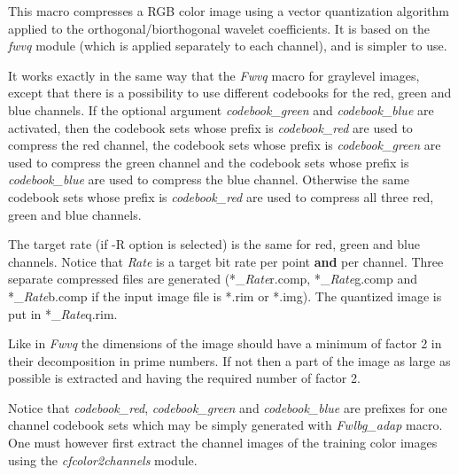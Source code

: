 This macro compresses a RGB color image using a vector quantization 
algorithm applied to the orthogonal/biorthogonal wavelet coefficients. 
It is based on the {\em fwvq} module (which is applied separately 
to each channel), and is simpler to use. 

It works exactly in the same way that the {\em Fwvq} macro for graylevel 
images, except that there is a possibility to use different codebooks 
for the red, green and blue channels. If the optional argument 
{\em codebook\_green} and {\em codebook\_blue} are activated, 
then the codebook sets whose prefix is {\em codebook\_red} are used 
to compress the red channel, the codebook sets whose prefix is 
{\em codebook\_green} are used to compress the green channel and 
the codebook sets whose prefix is {\em codebook\_blue} are used 
to compress the blue channel. Otherwise the same codebook sets whose prefix 
is {\em codebook\_red} are used to compress all three red, green and 
blue channels. 

The target rate (if -R option is selected) is the same for red, green and 
blue channels. Notice that {\em Rate} is a target bit rate per point {\bf and} 
per channel. Three separate compressed files are generated 
(*\_{\em Rate}r.comp, *\_{\em Rate}g.comp and *\_{\em Rate}b.comp 
if the input image file is *.rim or *.img). 
The quantized image is put in *\_{\em Rate}q.rim. 

Like in {\em Fwvq} the dimensions of the image should have a minimum 
of factor 2 in their decomposition in prime numbers. If not then a part of the 
image as large as possible is extracted and having the required 
number of factor 2. 

Notice that {\em codebook\_red}, {\em codebook\_green} 
and {\em codebook\_blue} are prefixes for one channel codebook sets 
which may be simply generated with {\em Fwlbg\_adap} macro. 
One must however first extract the channel images of the training color 
images using the {\em cfcolor2channels} module.
